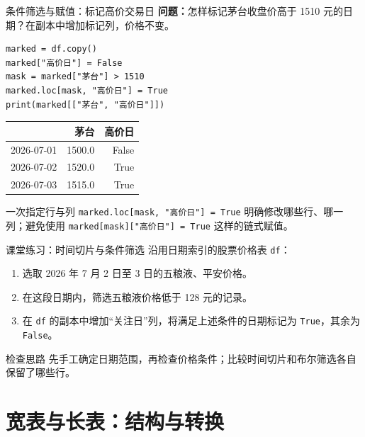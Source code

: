 \documentclass[9pt]{ctexbeamer}
\begin{document}
\begin{frame}[fragile]{条件筛选与赋值：标记高价交易日}
\small \textbf{问题：}怎样标记茅台收盘价高于 1510 元的日期？在副本中增加标记列，价格不变。
\begin{lstlisting}
marked = df.copy()
marked["高价日"] = False
mask = marked["茅台"] > 1510
marked.loc[mask, "高价日"] = True
print(marked[["茅台", "高价日"]])
\end{lstlisting}
\begin{center}
\begin{tabular}{lrr}
\toprule
 & 茅台 & 高价日 \\
\midrule
2026-07-01 & 1500.0 & False \\
2026-07-02 & 1520.0 & True \\
2026-07-03 & 1515.0 & True \\
\bottomrule
\end{tabular}
\end{center}
\begin{block}{一次指定行与列}
\texttt{marked.loc[mask, "高价日"] = True} 明确修改哪些行、哪一列；避免使用 \texttt{marked[mask]["高价日"] = True} 这样的链式赋值。
\end{block}
\end{frame}

\begin{frame}[fragile]{课堂练习：时间切片与条件筛选}
沿用日期索引的股票价格表 \texttt{df}：
\begin{enumerate}
\item 选取 2026 年 7 月 2 日至 3 日的五粮液、平安价格。
\item 在这段日期内，筛选五粮液价格低于 128 元的记录。
\item 在 \texttt{df} 的副本中增加“关注日”列，将满足上述条件的日期标记为 \texttt{True}，其余为 \texttt{False}。
\end{enumerate}
\begin{block}{检查思路}
先手工确定日期范围，再检查价格条件；比较时间切片和布尔筛选各自保留了哪些行。
\end{block}
\end{frame}

\section{宽表与长表：结构与转换}
\end{document}
